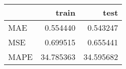 \begin{tabular}{lrr}
\toprule
{} &      train &       test \\
\midrule
MAE  &   0.554440 &   0.543247 \\
MSE  &   0.699515 &   0.655441 \\
MAPE &  34.785363 &  34.595682 \\
\bottomrule
\end{tabular}
